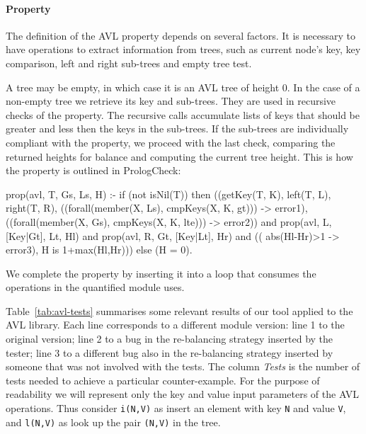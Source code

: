 \documentclass[runningheads,a4paper]{../../PaperStyles/llncs}
\newcommand{\yap}[1]{\lstinline[style=yap]{#1}}
\newcommand{\refTabI}[1]{Table~\ref{#1}}
\newcommand{\plqc}[0]{{\sf PrologCheck}}
\begin{document}


\paragraph{\bf Property}


The definition of the AVL property depends on several factors.
%
It is necessary to have operations to extract information from trees,
such as current node's key, key comparison, left and
right sub-trees and empty tree test.


A tree may be empty, in which case it is an AVL tree of height 0.
%
In the case of a non-empty tree we retrieve its key and sub-trees.
%
They are used in recursive checks of the property.
%
The recursive calls accumulate lists of keys that should be greater and
less then the keys in the sub-trees.
%
If the sub-trees are individually compliant with the property, we
proceed with the last check, comparing the returned heights for
balance and computing the current tree height.
%
This is how the property is outlined in \plqc{}:
%

\begin{yapcode}
prop({avl, T, Gs, Ls, H}) :- if (not isNil(T)) then
 ((getKey(T, K), left(T, L),  right(T, R),
      ((forall(member(X, Ls), cmpKeys(X, K, gt))) -> error1),
      ((forall(member(X, Gs), cmpKeys(X, K, lte))) -> error2))
   and prop({avl, L, [Key|Gt], Lt, Hl})
   and prop({avl, R, Gt, [Key|Lt], Hr})
   and (( abs(Hl-Hr)>1 -> error3), H is 1+max(Hl,Hr)))
 else (H = 0).
\end{yapcode}
%
We complete the property by inserting it into a loop that consumes the
operations in the quantified module uses.



\refTabI{tab:avl-tests} summarises some relevant results of our tool
applied to the AVL library.
%
Each line corresponds to a different module version: line 1 to the
original version; line 2 to a bug in the re-balancing strategy inserted
by the tester; line 3 to a different bug also in the re-balancing
strategy inserted by someone that was not involved with the tests.
%
The column \emph{Tests} is the number of tests needed to achieve a
particular counter-example.
%
For the purpose of readability we will represent only the key and value
input parameters of the AVL operations.
%
Thus consider \yap{i(N,V)} as insert an
element with key \yap{N} and value  \yap{V}, and \yap{l(N,V)} as look up
the pair \yap{(N,V)} in the tree.
\end{document}
